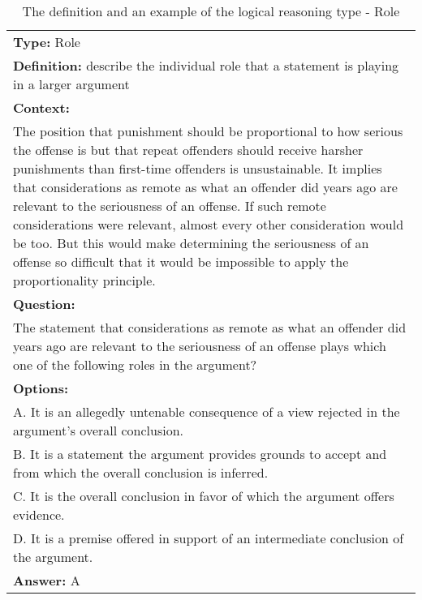 \documentclass{article} \usepackage{iclr2020_conference,times}
\begin{document}
\begin{table}
	\small
	\centering
	\caption{The definition and an example of the logical reasoning type - Role}
	\begin{tabular}{|p{}|}
		\hline
		{\bf Type: } Role\\
		
		{\bf Definition: }describe the individual role that a statement is playing in a larger argument
		\\
		\hline
		{\bf Context:}\\
		The position that punishment should be proportional to how serious the offense is but that repeat offenders should receive harsher punishments than first-time offenders is unsustainable. It implies that considerations as remote as what an offender did years ago are relevant to the seriousness of an offense. If such remote considerations were relevant, almost every other consideration would be too. But this would make determining the seriousness of an offense so difficult that it would be impossible to apply the proportionality principle. \\
		{\bf Question:}\\The statement that considerations as remote as what an offender did years ago are relevant to the seriousness of an offense plays which one of the following roles in the argument?\\
		{\bf Options:}\\
			A. It is an allegedly untenable consequence of a view rejected in the argument's overall conclusion.\\
			B. It is a statement the argument provides grounds to accept and from which the overall conclusion is inferred.\\
			C. It is the overall conclusion in favor of which the argument offers evidence.\\
			D. It is a premise offered in support of an intermediate conclusion of the argument.\\
		{\bf Answer: }A \\
		\hline
	\end{tabular}
	\label{tab:role}
\end{table}
\end{document}

